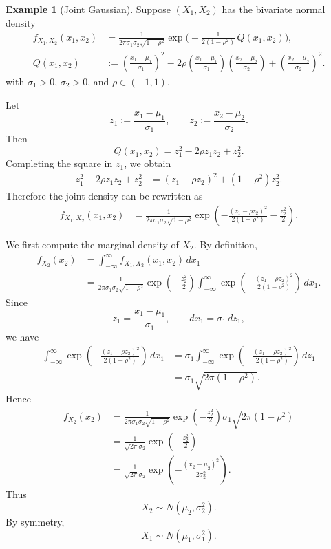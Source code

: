 \documentclass[11pt]{article}
\theoremstyle{plain}
\theoremstyle{definition}
\newtheorem{example}[theorem]{Example}
\theoremstyle{remark}
\begin{document}
	
\begin{example}[Joint Gaussian]
	Suppose \((X_1,X_2)\) has the bivariate normal density
	\begin{align*}
		f_{X_1,X_2}(x_1,x_2)
		&=
		\frac{1}{2\pi\sigma_1\sigma_2\sqrt{1-\rho^2}}
		\exp\!\Bigg(
		-\frac{1}{2(1-\rho^2)}\,Q(x_1,x_2)
		\Bigg),\\[4pt]
		Q(x_1,x_2)
		&:=
		\left(\frac{x_1-\mu_1}{\sigma_1}\right)^2
		-2\rho\left(\frac{x_1-\mu_1}{\sigma_1}\right)
		\left(\frac{x_2-\mu_2}{\sigma_2}\right)
		+\left(\frac{x_2-\mu_2}{\sigma_2}\right)^2 .
	\end{align*}
	with \(\sigma_1>0\), \(\sigma_2>0\), and \(\rho\in(-1,1)\).
	
	Let
	\[
	z_1:=\frac{x_1-\mu_1}{\sigma_1},
	\qquad
	z_2:=\frac{x_2-\mu_2}{\sigma_2}.
	\]
	Then
	\[
	Q(x_1,x_2)
	=
	z_1^2-2\rho z_1z_2+z_2^2.
	\]
	Completing the square in \(z_1\), we obtain
	\begin{align*}
		z_1^2-2\rho z_1z_2+z_2^2
		&=
		(z_1-\rho z_2)^2+(1-\rho^2)z_2^2.
	\end{align*}
	Therefore the joint density can be rewritten as
	\begin{align*}
		f_{X_1,X_2}(x_1,x_2)
		&=
		\frac{1}{2\pi\sigma_1\sigma_2\sqrt{1-\rho^2}}
		\exp\!\left(
		-\frac{(z_1-\rho z_2)^2}{2(1-\rho^2)}
		-\frac{z_2^2}{2}
		\right).
	\end{align*}
	
	We first compute the marginal density of \(X_2\). By definition,
	\begin{align*}
		f_{X_2}(x_2)
		&=
		\int_{-\infty}^{\infty}
		f_{X_1,X_2}(x_1,x_2)\,dx_1 \\
		&=
		\frac{1}{2\pi\sigma_1\sigma_2\sqrt{1-\rho^2}}
		\exp\!\left(-\frac{z_2^2}{2}\right)
		\int_{-\infty}^{\infty}
		\exp\!\left(
		-\frac{(z_1-\rho z_2)^2}{2(1-\rho^2)}
		\right)\,dx_1.
	\end{align*}
	Since
	\[
	z_1=\frac{x_1-\mu_1}{\sigma_1},
	\qquad
	dx_1=\sigma_1\,dz_1,
	\]
	we have
	\begin{align*}
		\int_{-\infty}^{\infty}
		\exp\!\left(
		-\frac{(z_1-\rho z_2)^2}{2(1-\rho^2)}
		\right)\,dx_1
		&=
		\sigma_1
		\int_{-\infty}^{\infty}
		\exp\!\left(
		-\frac{(z_1-\rho z_2)^2}{2(1-\rho^2)}
		\right)\,dz_1 \\
		&=
		\sigma_1\sqrt{2\pi(1-\rho^2)}.
	\end{align*}
	Hence
	\begin{align*}
		f_{X_2}(x_2)
		&=
		\frac{1}{2\pi\sigma_1\sigma_2\sqrt{1-\rho^2}}
		\exp\!\left(-\frac{z_2^2}{2}\right)
		\sigma_1\sqrt{2\pi(1-\rho^2)} \\
		&=
		\frac{1}{\sqrt{2\pi}\sigma_2}
		\exp\!\left(-\frac{z_2^2}{2}\right) \\
		&=
		\frac{1}{\sqrt{2\pi}\sigma_2}
		\exp\!\left(
		-\frac{(x_2-\mu_2)^2}{2\sigma_2^2}
		\right).
	\end{align*}
	Thus
	\[
	X_2\sim N(\mu_2,\sigma_2^2).
	\]
	By symmetry,
	\[
	X_1\sim N(\mu_1,\sigma_1^2).
	\]
	

\end{example}
\end{document}
